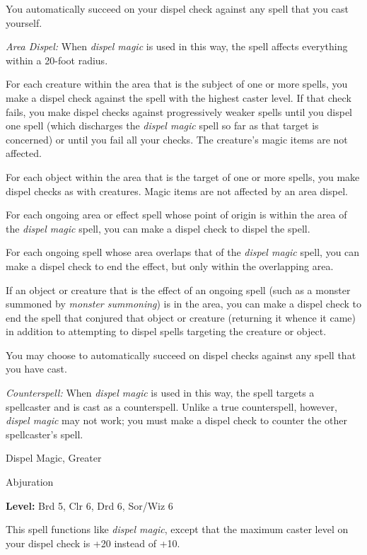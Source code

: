 \documentclass{article}
\begin{document}
You automatically succeed on your dispel check against any spell that you cast 
yourself.

\textit{Area Dispel: }When \textit{dispel magic }is used in this way, the spell 
affects everything within a 20-foot radius.

For each creature within the area that is the subject of one or more spells, you 
make a dispel check against the spell with the highest caster level. If that check 
fails, you make dispel checks against progressively weaker spells until you dispel 
one spell (which discharges the \textit{dispel magic }spell so far as that target 
is concerned) or until you fail all your checks. The creature's magic items are 
not affected.

For each object within the area that is the target of one or more spells, you make 
dispel checks as with creatures. Magic items are not affected by an area dispel.

For each ongoing area or effect spell whose point of origin is within the area 
of the \textit{dispel magic }spell, you can make a dispel check to dispel the spell.

For each ongoing spell whose area overlaps that of the \textit{dispel magic }spell, 
you can make a dispel check to end the effect, but only within the overlapping 
area.

If an object or creature that is the effect of an ongoing spell (such as a monster 
summoned by \textit{monster summoning}) is in the area, you can make a dispel check 
to end the spell that conjured that object or creature (returning it whence it 
came) in addition to attempting to dispel spells targeting the creature or object.

You may choose to automatically succeed on dispel checks against any spell that 
you have cast.

\textit{Counterspell: }When \textit{dispel magic }is used in this way, the spell 
targets a spellcaster and is cast as a counterspell. Unlike a true counterspell, 
however, \textit{dispel magic }may not work; you must make a dispel check to counter 
the other spellcaster's spell.

\vspace{12pt}
Dispel Magic, Greater

Abjuration

\textbf{Level:} Brd 5, Clr 6, Drd 6, Sor/Wiz 6

This spell functions like \textit{dispel magic}, except that the maximum caster 
level on your dispel check is +20 instead of +10.
\end{document}
